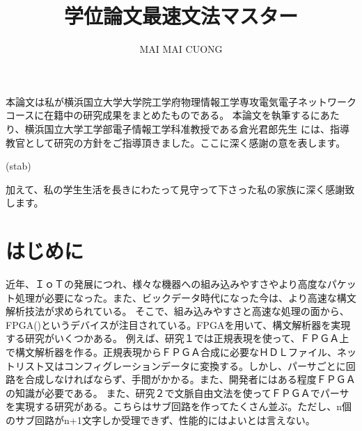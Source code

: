 \documentclass[12pt,oneside]{report}
\begin{document}
\title{学位論文最速文法マスター}
\author{MAI MAI CUONG}






\beforepreface
\tablespagefalse





本論文は私が横浜国立大学大学院工学府物理情報工学専攻電気電子ネットワークコースに在籍中の研究成果をまとめたものである。
本論文を執筆するにあたり、横浜国立大学工学部電子情報工学科准教授である倉光君郎先生
には、指導教官として研究の方針をご指導頂きました。ここに深く感謝の意を表します。

(stab)

加えて、私の学生生活を長きにわたって見守って下さった私の家族に深く感謝致します。
\afterpreface

\chapter{はじめに}
\label{Introduction}

近年、ＩｏＴの発展につれ、様々な機器への組み込みやすさやより高度なパケット処理が必要になった。また、ビックデータ時代になった今は、より高速な構文解析技法が求められている。
そこで、組み込みやすさと高速な処理の面から、FPGA()というデバイスが注目されている。FPGAを用いて、構文解析器を実現する研究がいくつかある。
例えば、研究１では正規表現を使って、ＦＰＧＡ上で構文解析器を作る。正規表現からＦＰＧＡ合成に必要なＨＤＬファイル、ネットリスト又はコンフィグレーションデータに変換する。しかし、パーサごとに回路を合成しなければならず、手間がかかる。また、開発者にはある程度ＦＰＧＡの知識が必要である。
また、研究２で文脈自由文法を使ってＦＰＧＡでパーサを実現する研究がある。こちらはサブ回路を作ってたくさん並ぶ。ただし、n個のサブ回路がn+1文字しか受理できず、性能的にはよいとは言えない。
\end{document}
